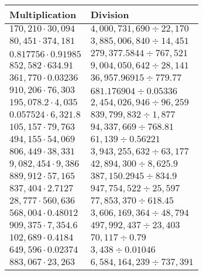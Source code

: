 \begin{longtable}[]{@{}ll@{}}
\toprule
Multiplication & Division\tabularnewline
\midrule
\endhead
\(170,210\cdot30,094\) & \(4,000,731,690÷22,170\)\tabularnewline
\(80,451\cdot374,181\) & \(3,885,006,840÷14,451\)\tabularnewline
\(0.817756\cdot0.91985\) & \(279,377.5844÷767,521\)\tabularnewline
\(852,582\cdot634.91\) & \(9,004,050,642÷28,141\)\tabularnewline
\(361,770\cdot0.03236\) & \(36,957.96915÷779.77\)\tabularnewline
\(910,206\cdot76,303\) & \(681.176904÷0.05336\)\tabularnewline
\(195,078.2\cdot4,035\) & \(2,454,026,946÷96,259\)\tabularnewline
\(0.057524\cdot6,321.8\) & \(839,799,832÷1,877\)\tabularnewline
\(105,157\cdot79,763\) & \(94,337,669÷768.81\)\tabularnewline
\(494,155\cdot54,069\) & \(61,139÷0.56221\)\tabularnewline
\(806,449\cdot38,331\) & \(3,943,255,632÷63,177\)\tabularnewline
\(9,082,454\cdot9,386\) & \(42,894,300÷8,625.9\)\tabularnewline
\(889,912\cdot57,165\) & \(387,150.2945÷834.9\)\tabularnewline
\(837,404\cdot2.7127\) & \(947,754,522÷25,597\)\tabularnewline
\(28,777\cdot560,636\) & \(77,853,370÷618.45\)\tabularnewline
\(568,004\cdot0.48012\) & \(3,606,169,364÷48,794\)\tabularnewline
\(909,375\cdot7,354.6\) & \(497,992,437÷23,403\)\tabularnewline
\(102,689\cdot0.4184\) & \(70,117÷0.79\)\tabularnewline
\(649,596\cdot0.02374\) & \(3,438÷0.01046\)\tabularnewline
\(883,067\cdot23,263\) & \(6,584,164,239÷737,391\)\tabularnewline
\bottomrule
\end{longtable}
